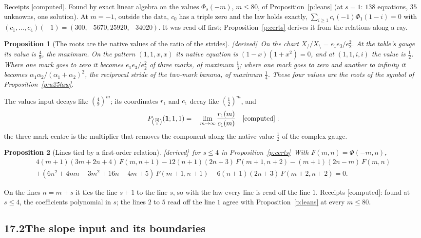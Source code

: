 \documentclass[11pt]{article}
\newcommand{\one}{\mathbf 1}
\newcommand{\Pth}{P_{\binom{[3]}1}(\one;1,1)}
\theoremstyle{plain}
\newtheorem{proposition}{Proposition}[section]
\theoremstyle{definition}
\theoremstyle{remark}
\newcommand{\derived}{\textup{[derived]}}
\newcommand{\computed}{\textup{[computed]}}
\begin{document}
\noindent Receipts \computed. Found by exact linear algebra on the values $\Phi_s(-m)$, $m\le80$, of Proposition~\ref{p:leans} (at $s=1$: $138$ equations, $35$ unknowns, one solution). At $m=-1$, outside the data, $c_0$ has a triple zero and the law holds exactly, $\sum_{i\ge1}c_i(-1)\Phi_1(1-i)=0$ with $(c_1,\dots,c_4)(-1)=(300,-5670,25920,-34020)$. It was read off first; Proposition~\ref{p:certs} derives it from the relations along a ray.

\begin{proposition}[The roots are the native values of the ratio of the strides]\label{p:u25roots}\derived\
On the chart $X_{/}/X_{\setminus}=e_1e_3/e_2^2$. At the table's gauge its value is $\frac49$, the maximum. On the pattern $(1,1,x,x)$ its native equation is $(1-x)(1+x^2)=0$, and at $(1,1,i,i)$ the value is $\frac12$. Where one mark goes to zero it becomes $e_1e_3/e_2^2$ of three marks, of maximum $\frac13$; where one mark goes to zero and another to infinity it becomes $\alpha_1\alpha_2/(\alpha_1+\alpha_2)^2$, the reciprocal stride of the two-mark banana, of maximum $\frac14$. These four values are the roots of the symbol of Proposition~\ref{p:u25law}.
\end{proposition}

The values input decays like $(\frac49)^m$; its coordinates $r_1$ and $c_1$ decay like $(\frac12)^m$, and
\[
\Pth=-\lim_{m\to\infty}\frac{r_1(m)}{c_1(m)}\quad\computed:
\]
the three-mark centre is the multiplier that removes the component along the native value $\frac12$ of the complex gauge.

\begin{proposition}[Lines tied by a first-order relation]\label{p:u25mix}\derived\ for $s\le4$ in Proposition~\ref{p:certs}\
With $F(m,n)=\Phi(-m,n)$,
\begin{multline*}
4(m+1)(3m+2n+4)\,F(m,n+1)-12(n+1)(2n+3)\,F(m+1,n+2)-(m+1)(2n-m)\,F(m,n)\\
+(6n^2+4mn-3m^2+16n-4m+5)\,F(m+1,n+1)-6(n+1)(2n+3)\,F(m+2,n+2)=0.
\end{multline*}
\end{proposition}

On the lines $n=m+s$ it ties the line $s+1$ to the line $s$, so with the law every line is read off the line $1$. Receipts \computed: found at $s\le4$, the coefficients polynomial in $s$; the lines $2$ to $5$ read off the line $1$ agree with Proposition~\ref{p:leans} at every $m\le80$.

\subsection*{17.2\quad The slope input and its boundaries}
\end{document}
